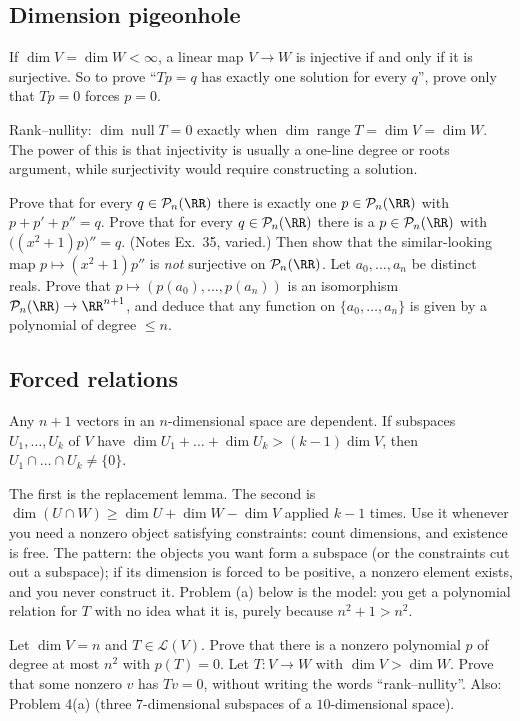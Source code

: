 \documentclass[11pt]{scrartcl}
\DeclareMathOperator{\nul}{null}
\DeclareMathOperator{\range}{range}
\newcommand{\LL}{\mathcal L}
\newcommand{\PP}{\mathcal P}
\begin{document}
\subsection{Dimension pigeonhole}
\begin{theorem*}[T1]
  If $\dim V=\dim W<\infty$, a linear map $V\to W$ is injective if and only if it is surjective.
  So to prove ``$Tp=q$ has exactly one solution for every $q$'', prove only that $Tp=0$ forces $p=0$.
\end{theorem*}
\why Rank--nullity: $\dim\nul T=0$ exactly when $\dim\range T=\dim V=\dim W$.
The power of this is that injectivity is usually a one-line degree or roots argument, while surjectivity would require constructing a solution.
\probs
\begin{enumerate}[(a)]
  \ii Prove that for every $q\in\PP_n(\RR)$ there is exactly one $p\in\PP_n(\RR)$ with $p+p'+p''=q$.
  \ii Prove that for every $q\in\PP_n(\RR)$ there is a $p\in\PP_n(\RR)$ with $\big((x^2+1)p\big)''=q$. (Notes Ex.~35, varied.) Then show that the similar-looking map $p\mapsto(x^2+1)p''$ is \emph{not} surjective on $\PP_n(\RR)$.
  \ii Let $a_0,\dots,a_n$ be distinct reals. Prove that $p\mapsto(p(a_0),\dots,p(a_n))$ is an isomorphism $\PP_n(\RR)\to\RR^{n+1}$, and deduce that any function on $\{a_0,\dots,a_n\}$ is given by a polynomial of degree $\le n$.
\end{enumerate}

\subsection{Forced relations}
\begin{theorem*}[T2]
  Any $n+1$ vectors in an $n$-dimensional space are dependent.
  If subspaces $U_1,\dots,U_k$ of $V$ have $\dim U_1+\dots+\dim U_k>(k-1)\dim V$, then $U_1\cap\dots\cap U_k\ne\{0\}$.
\end{theorem*}
\why The first is the replacement lemma. The second is $\dim(U\cap W)\ge\dim U+\dim W-\dim V$ applied $k-1$ times.
Use it whenever you need a nonzero object satisfying constraints: count dimensions, and existence is free.
The pattern: the objects you want form a subspace (or the constraints cut out a subspace); if its dimension is forced to be positive, a nonzero element exists, and you never construct it. Problem (a) below is the model: you get a polynomial relation for $T$ with no idea what it is, purely because $n^2+1>n^2$.
\probs
\begin{enumerate}[(a)]
  \ii Let $\dim V=n$ and $T\in\LL(V)$. Prove that there is a nonzero polynomial $p$ of degree at most $n^2$ with $p(T)=0$.
  \ii Let $T\colon V\to W$ with $\dim V>\dim W$. Prove that some nonzero $v$ has $Tv=0$, without writing the words ``rank--nullity''.
  \ii Also: Problem 4(a) (three $7$-dimensional subspaces of a $10$-dimensional space).
\end{enumerate}
\end{document}
